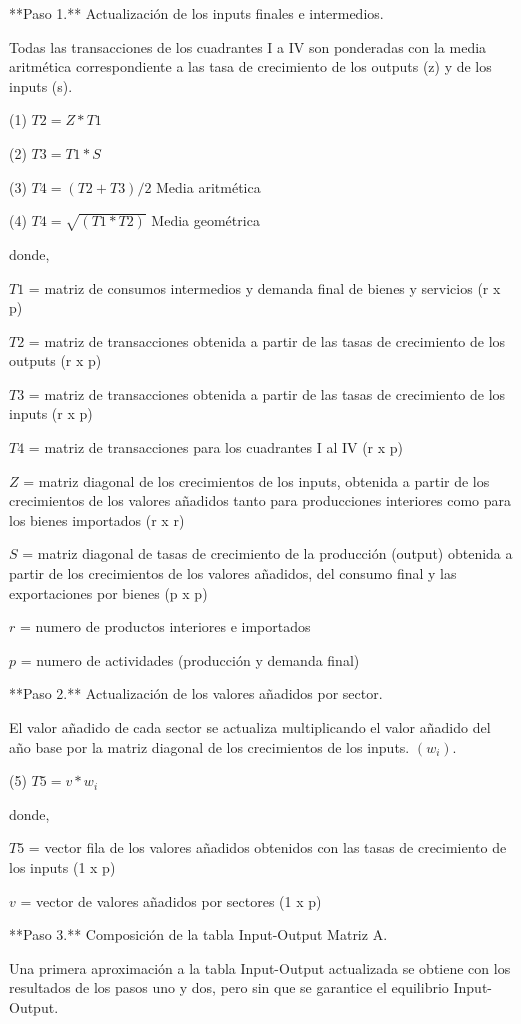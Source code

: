 \documentclass{article}
\begin{document}
**Paso 1.** Actualización de los inputs finales e intermedios.

Todas las transacciones de los cuadrantes I a IV son ponderadas con la media aritmética correspondiente a las tasa de crecimiento de los outputs (z) y de los inputs (s).

(1) $T2 = Z*T1$

(2) $T3 = T1*S$

(3) $T4 = (T2 + T3)/2$ Media aritmética

(4) $T4 = \sqrt {(T1* T2)}$ Media geométrica

donde,

$T1$ = matriz de consumos intermedios y demanda final de bienes y servicios (r x p)

$T2$ = matriz de transacciones obtenida a partir de  las tasas de crecimiento de los outputs (r x p)

$T3$ = matriz de transacciones obtenida a partir de  las tasas de crecimiento de los inputs  (r x p)

$T4$ = matriz de transacciones para los cuadrantes I al IV (r x p)

$Z$ = matriz diagonal de los crecimientos de los inputs, obtenida a partir de los crecimientos de los valores añadidos  tanto para producciones interiores como para los bienes importados (r x r)

$S$ = matriz diagonal de tasas de crecimiento de la producción (output) obtenida a partir de los crecimientos de los valores añadidos, del consumo final y las exportaciones por bienes (p x p)

$r$ = numero de productos interiores e importados

$p$ = numero de actividades  (producción y demanda  final)

**Paso 2.** Actualización de los valores añadidos por sector.

El valor añadido de cada sector se actualiza multiplicando el valor añadido del año base por la matriz diagonal de los crecimientos de los inputs. $(w_i)$.

(5) $T5 = v * w_i$

donde,

$T5$ = vector fila de los valores añadidos obtenidos con las tasas de crecimiento de los inputs (1 x p)

$v$ = vector de valores añadidos por sectores (1 x p)

**Paso 3.** Composición de la tabla Input-Output Matriz A.

Una primera aproximación a la tabla Input-Output actualizada se obtiene con los resultados de los pasos uno y dos, pero sin que se garantice el equilibrio Input-Output.
\end{document}
